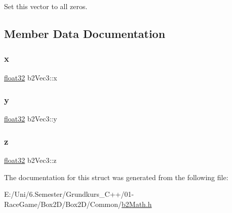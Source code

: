 Set this vector to all zeros. 



\subsection{Member Data Documentation}
\mbox{\label{structb2_vec3_aedc5e37849caa413a8e767fc47741db2}} 
\subsubsection{\texorpdfstring{x}{x}}
{\footnotesize\ttfamily \mbox{\hyperlink{b2_settings_8h_aacdc525d6f7bddb3ae95d5c311bd06a1}{float32}} b2\+Vec3\+::x}

\mbox{\label{structb2_vec3_af5a7e99d13d02ff9abb323838d44d3b1}} 
\subsubsection{\texorpdfstring{y}{y}}
{\footnotesize\ttfamily \mbox{\hyperlink{b2_settings_8h_aacdc525d6f7bddb3ae95d5c311bd06a1}{float32}} b2\+Vec3\+::y}

\mbox{\label{structb2_vec3_a7cb88968ff10fa500df0b10f5c425536}} 
\subsubsection{\texorpdfstring{z}{z}}
{\footnotesize\ttfamily \mbox{\hyperlink{b2_settings_8h_aacdc525d6f7bddb3ae95d5c311bd06a1}{float32}} b2\+Vec3\+::z}



The documentation for this struct was generated from the following file\+:\begin{DoxyCompactItemize}
\item 
E\+:/\+Uni/6.\+Semester/\+Grundkurs\+\_\+\+C++/01-\/\+Race\+Game/\+Box2\+D/\+Box2\+D/\+Common/\mbox{\hyperlink{b2_math_8h}{b2\+Math.\+h}}\end{DoxyCompactItemize}
